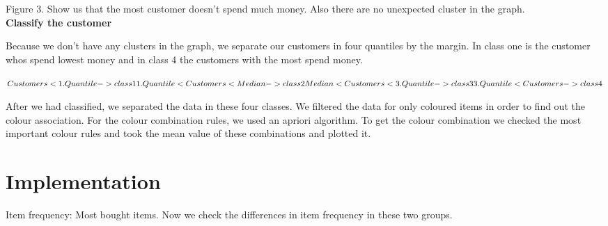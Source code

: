 \documentclass[11pt]{article}
\begin{document}
Figure 3. Show us that the most customer doesn't spend much money. Also there are no unexpected cluster in the graph.\\


\textbf{Classify the customer}

Because we don't have any clusters in the graph, we separate our customers in four quantiles by the margin. In class one is the customer whos spend lowest money and in class 4 the customers with the most spend money.


$
 Customers < 1.Quantile -> class 1 \\
 1.Quantile < Customers < Median -> class 2 \\
 Median < Customers < 3.Quantile -> class 3 \\
 3.Quantile < Customers -> class 4\\
$

After we had classified, we separated the data in these four classes. 
We filtered the data for only coloured items in order to find out the colour association. For the colour combination rules, we used an apriori algorithm. 
To get the colour combination we checked the most important colour rules and took the mean value of these combinations and plotted it.


\section{Implementation}



Item frequency: Most bought items.
Now we check the differences in item frequency in these two groups.
\end{document}
